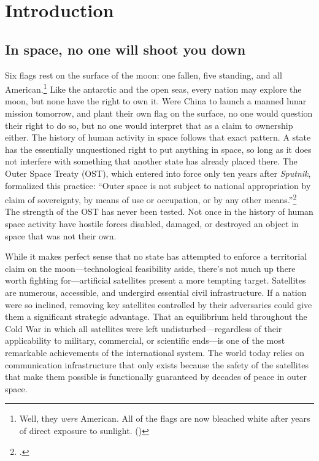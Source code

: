 \documentclass{report}
\begin{document}
\section{Introduction}
\subsection{In space, no one will shoot you down}
Six flags rest on the surface of the moon: one fallen, five standing, and all American.\footnote{Well, they \emph{were} American. All of the flags are now bleached white after years of direct exposure to sunlight. (\cite{spudis_faded_2011})} Like the antarctic and the open seas, every nation may explore the moon, but none have the right to own it. Were China to launch a manned lunar mission tomorrow, and plant their own flag on the surface, no one would question their right to do so, but no one would interpret that as a claim to ownership either. The history of human activity in space follows that exact pattern. A state has the essentially unquestioned right to put anything in space, so long as it does not interfere with something that another state has already placed there. The Outer Space Treaty (OST), which entered into force only ten years after \emph{Sputnik}, formalized this practice: ``Outer space \textelp{} is not subject to national appropriation by claim of sovereignty, by means of use or occupation, or by any other means.''\footcite{noauthor_outer_1966} The strength of the OST has never been tested. Not once in the history of human space activity have hostile forces disabled, damaged, or destroyed an object in space that was not their own.

While it makes perfect sense that no state has attempted to enforce a territorial claim on the moon---technological feasibility aside, there's not much up there worth fighting for---artificial satellites present a more tempting target. Satellites are numerous, accessible, and undergird essential civil infrastructure. If a nation were so inclined, removing key satellites controlled by their adversaries could give them a significant strategic advantage. That an equilibrium held throughout the Cold War in which all satellites were left undisturbed---regardless of their applicability to military, commercial, or scientific ends---is one of the most remarkable achievements of the international system. The world today relies on communication infrastructure that only exists because the safety of the satellites that make them possible is functionally guaranteed by decades of peace in outer space.
\end{document}
